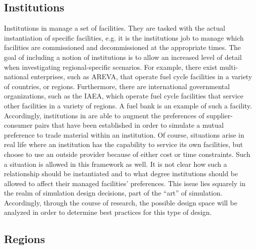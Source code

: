 \subsection{Institutions}

Institutions in \Cyclus manage a set of facilities. They are tasked with the
actual instantiation of specific facilities, e.g. it is the institutions job to
manage which facilities are commissioned and decommissioned at the appropriate
times. The goal of including a notion of institutions is to allow an increased
level of detail when investigating regional-specific scenarios. For example,
there exist multi-national enterprises, such as AREVA, that operate fuel cycle
facilities in a variety of countries, or regions. Furthermore, there are
international governmental organizations, such as the IAEA, which operate fuel
cycle facilities that service other facilities in a variety of regions. A fuel
bank is an example of such a facility. Accordingly, institutions in \Cyclus are
able to augment the preferences of supplier-consumer pairs that have been
established in order to simulate a mutual preference to trade material within an
institution. Of course, situations arise in real life where an institution has
the capability to service its own facilities, but choose to use an outside
provider because of either cost or time constraints. Such a situation is allowed
in this framework as well. It is not clear how such a relationship should be
instantiated and to what degree institutions should be allowed to affect their
managed facilities' preferences. This issue lies squarely in the realm of
simulation design decisions, part of the ``art'' of simulation. Accordingly,
through the course of research, the possible design space will be analyzed in
order to determine best practices for this type of design.

\subsection{Regions}

